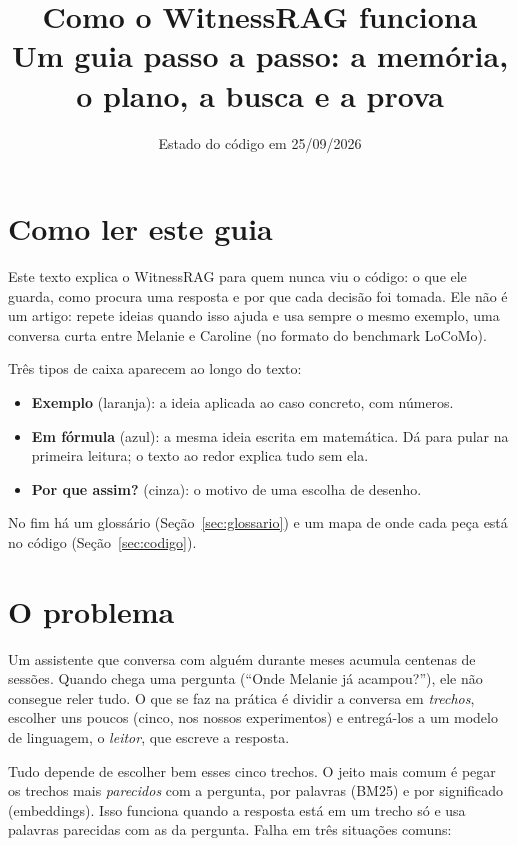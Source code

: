 \documentclass[11pt]{article}
\title{\textbf{Como o WitnessRAG funciona}\\[4pt]
\large Um guia passo a passo: a memória, o plano, a busca e a prova}
\author{}
\date{Estado do código em 25/09/2026}
\begin{document}
\maketitle
\thispagestyle{empty}

\section*{Como ler este guia}

Este texto explica o WitnessRAG para quem nunca viu o código: o que ele guarda,
como procura uma resposta e por que cada decisão foi tomada. Ele não é um
artigo: repete ideias quando isso ajuda e usa sempre o mesmo exemplo, uma
conversa curta entre Melanie e Caroline (no formato do benchmark LoCoMo).

Três tipos de caixa aparecem ao longo do texto:
\begin{itemize}
\item \textbf{Exemplo} (laranja): a ideia aplicada ao caso concreto, com números.
\item \textbf{Em fórmula} (azul): a mesma ideia escrita em matemática. Dá para
  pular na primeira leitura; o texto ao redor explica tudo sem ela.
\item \textbf{Por que assim?} (cinza): o motivo de uma escolha de desenho.
\end{itemize}
No fim há um glossário (Seção~\ref{sec:glossario}) e um mapa de onde cada
peça está no código (Seção~\ref{sec:codigo}).

\tableofcontents

\section{O problema}
\label{sec:problema}

Um assistente que conversa com alguém durante meses acumula centenas de
sessões. Quando chega uma pergunta (``Onde Melanie já acampou?''), ele não
consegue reler tudo. O que se faz na prática é dividir a conversa em
\emph{trechos}, escolher uns poucos (cinco, nos nossos experimentos) e
entregá-los a um modelo de linguagem, o \emph{leitor}, que escreve a resposta.

Tudo depende de escolher bem esses cinco trechos. O jeito mais comum é pegar
os trechos mais \emph{parecidos} com a pergunta, por palavras (BM25) e por
significado (embeddings). Isso funciona quando a resposta está em um trecho só
e usa palavras parecidas com as da pergunta. Falha em três situações comuns:
\end{document}
